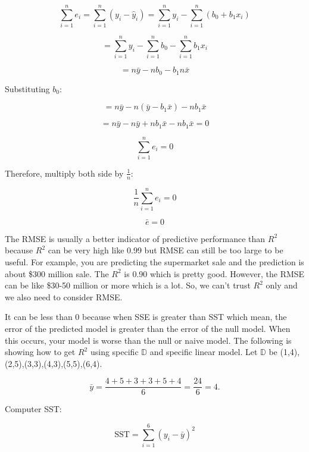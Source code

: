 \documentclass[12pt]{article}
\begin{document}
\begin{enumerate}
\[
\sum_{i=1}^{n} e_i = \sum_{i=1}^{n} (y_i - \hat{y}_i) = \sum_{i=1}^{n} y_i - \sum_{i=1}^{n} (b_0 + b_1 x_i)
\]

\[
= \sum_{i=1}^{n} y_i - \sum_{i=1}^{n} b_0 - \sum_{i=1}^{n} b_1 x_i
\]

\[
= n\bar{y} - n b_0 - b_1 n\bar{x}
\]

Substituting \( b_0 \):

\[
= n\bar{y} - n (\bar{y} - b_1 \bar{x}) - n b_1 \bar{x}
\]

\[
= n\bar{y} - n\bar{y} + n b_1 \bar{x} - n b_1 \bar{x} = 0
\]

\[
\sum_{i=1}^{n} e_i = 0
\]

Therefore, multiply both side by $\frac{1}{n}$:

\[
\frac{1}{n} \sum_{i=1}^{n} e_i = 0
\]

\[
\bar{e} = 0
\]



The RMSE is usually a better indicator of predictive performance than $R^2$ because $R^2$ can be very high like 0.99 but RMSE can still be too large to be useful. For example, you are predicting the supermarket sale and the prediction is about \$300 million sale. The $R^2$ is 0.90 which is pretty good. However, the RMSE can be like \$30-50 million or more which is a lot. So, we can't trust $R^2$ only and we also need to consider RMSE.



It can be less than 0 because when SSE is greater than SST which mean, the error of the predicted model is greater than the error of the null model. When this occurs, your model is worse than the null or naive model. The following is showing how to get $R^2$ using specific $\mathbb{D}$ and specific linear model. Let $\mathbb{D}$ be {(1,4),(2,5),(3,3),(4,3),(5,5),(6,4)}. 

\[
\bar{y} = \frac{4 + 5 + 3 + 3 + 5 + 4}{6} = \frac{24}{6} = 4.
\]

Computer SST:

\[
\text{SST} = \sum_{i=1}^{6} (y_i - \bar{y})^2
\]


\end{enumerate}
\end{document}
